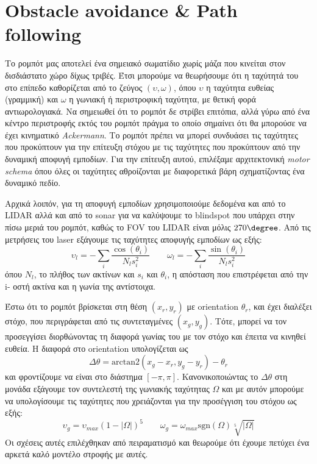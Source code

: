 \section*{Obstacle avoidance \& Path following}
Το ρομπότ μας αποτελεί ένα σημειακό σωματίδιο χωρίς μάζα που κινείται στον δισδιάστατο χώρο δίχως 
τριβές. Έτσι μπορούμε να θεωρήσουμε ότι η ταχύτητά του στο επίπεδο καθορίζεται από το ζεύγος
$\left( \upsilon, \omega \right)$, όπου $\upsilon$ η ταχύτητα ευθείας (γραμμική) και $\omega$ η 
γωνιακή ή περιστροφική ταχύτητα, με θετική φορά αντιωρολογιακά. Να σημειωθεί ότι το ρομπότ δε 
στρίβει επιτόπια, αλλά γύρω από ένα κέντρο περιστροφής εκτός του ρομπότ πράγμα το οποίο σημαίνει
ότι θα μπορούσε να έχει κινηματικό \emph{Ackermann}. Το ρομπότ πρέπει να μπορεί συνδυάσει τις 
ταχύτητες που προκύπτουν για την επίτευξη στόχου με τις ταχύτητες που προκύπτουν από την δυναμική 
αποφυγή εμποδίων. Για την επίτευξη αυτού, επιλέξαμε αρχιτεκτονική \emph{motor schema} όπου όλες οι 
ταχύτητες αθροίζονται με διαφορετικά βάρη σχηματίζοντας ένα δυναμικό πεδίο.

Αρχικά λοιπόν, για τη αποφυγή εμποδίων χρησιμοποιούμε δεδομένα και από το LIDAR αλλά και από το 
sonar για να καλύψουμε το blindspot που υπάρχει στην πίσω μεριά του ρομπότ, καθώς το FOV του LIDAR 
είναι μόλις $270\degree$. Από τις μετρήσεις του laser εξάγουμε τις ταχύτητες αποφυγής εμποδίων ως 
εξής:
$$
\upsilon_{l} = - \sum_i \frac{\cos(\theta_i)}{N_l s_i^2} \qquad 
\omega_{l} = - \sum_i \frac{\sin(\theta_i)}{N_l s_i^2}
$$
όπου $N_l$, το πλήθος των ακτίνων και $s_i$ και $\theta_i$, η απόσταση που επιστρέφεται από την i-
οστή ακτίνα και η γωνία της αντίστοιχα. %

Έστω ότι το ρομπότ βρίσκεται στη θέση $\left( x_r, y_r \right)$ με orientation $\theta_r$, και έχει 
διαλέξει στόχο, που περιγράφεται από τις συντεταγμένες $\left( x_g, y_g \right)$. Τότε, μπορεί να 
τον προσεγγίσει διορθώνοντας τη διαφορά γωνίας του με τον στόχο και έπειτα να κινηθεί ευθεία. Η 
διαφορά στο orientation υπολογίζεται ως
$$
\Delta\theta = \mathrm{arctan2}\left( x_g - x_r, y_g - y_r \right) - \theta_r
$$
και φροντίζουμε να είναι στο διάστημα $[-\pi, \pi]$. Κανονικοποιώντας το $\Delta\theta$ στη μονάδα 
εξάγουμε τον συντελεστή της γωνιακής ταχύτητας $\Omega$ και με αυτόν μπορούμε να υπολογίσουμε τις ταχύτητες που χρειάζονται για την προσέγγιση του στόχου ως εξής:
$$
\upsilon_{g} = \upsilon_{max} \left(1 - \left|\Omega\right|\right)^5 \qquad 
\omega_g = \omega_{max} \mathrm{sgn} \left( \Omega \right) \sqrt[5]{\left|\Omega\right|}
$$
Οι σχέσεις αυτές επιλέχθηκαν από πειραματισμό και θεωρούμε ότι έχουμε πετύχει ένα αρκετά καλό 
μοντέλο στροφής με αυτές.

